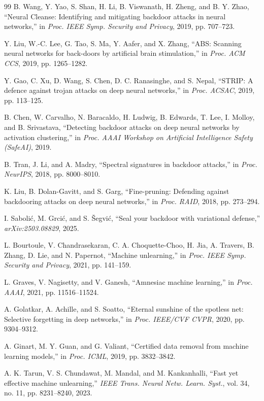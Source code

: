 \begin{thebibliography}{99}
B. Wang, Y. Yao, S. Shan, H. Li, B. Viswanath, H. Zheng, and B. Y. Zhao, ``Neural Cleanse: Identifying and mitigating backdoor attacks in neural networks,'' in \emph{Proc. IEEE Symp. Security and Privacy}, 2019, pp. 707--723.

Y. Liu, W.-C. Lee, G. Tao, S. Ma, Y. Aafer, and X. Zhang, ``ABS: Scanning neural networks for back-doors by artificial brain stimulation,'' in \emph{Proc. ACM CCS}, 2019, pp. 1265--1282.

Y. Gao, C. Xu, D. Wang, S. Chen, D. C. Ranasinghe, and S. Nepal, ``STRIP: A defence against trojan attacks on deep neural networks,'' in \emph{Proc. ACSAC}, 2019, pp. 113--125.

B. Chen, W. Carvalho, N. Baracaldo, H. Ludwig, B. Edwards, T. Lee, I. Molloy, and B. Srivastava, ``Detecting backdoor attacks on deep neural networks by activation clustering,'' in \emph{Proc. AAAI Workshop on Artificial Intelligence Safety (SafeAI)}, 2019.

B. Tran, J. Li, and A. Madry, ``Spectral signatures in backdoor attacks,'' in \emph{Proc. NeurIPS}, 2018, pp. 8000--8010.

K. Liu, B. Dolan-Gavitt, and S. Garg, ``Fine-pruning: Defending against backdooring attacks on deep neural networks,'' in \emph{Proc. RAID}, 2018, pp. 273--294.

I. Saboli\'c, M. Grci\'c, and S. \v{S}egvi\'c, ``Seal your backdoor with variational defense,'' \emph{arXiv:2503.08829}, 2025.

L. Bourtoule, V. Chandrasekaran, C. A. Choquette-Choo, H. Jia, A. Travers, B. Zhang, D. Lie, and N. Papernot, ``Machine unlearning,'' in \emph{Proc. IEEE Symp. Security and Privacy}, 2021, pp. 141--159.

L. Graves, V. Nagisetty, and V. Ganesh, ``Amnesiac machine learning,'' in \emph{Proc. AAAI}, 2021, pp. 11516--11524.

A. Golatkar, A. Achille, and S. Soatto, ``Eternal sunshine of the spotless net: Selective forgetting in deep networks,'' in \emph{Proc. IEEE/CVF CVPR}, 2020, pp. 9304--9312.

A. Ginart, M. Y. Guan, and G. Valiant, ``Certified data removal from machine learning models,'' in \emph{Proc. ICML}, 2019, pp. 3832--3842.

A. K. Tarun, V. S. Chundawat, M. Mandal, and M. Kankanhalli, ``Fast yet effective machine unlearning,'' \emph{IEEE Trans. Neural Netw. Learn. Syst.}, vol. 34, no. 11, pp. 8231--8240, 2023.


\end{thebibliography}
